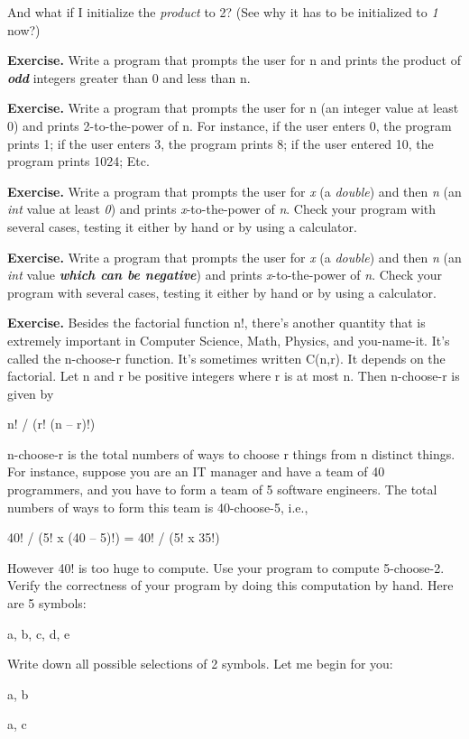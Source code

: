 \documentclass[
]{article}
\begin{document}
And what if I initialize the \emph{product} to 2? (See why it has to be
initialized to \emph{1} now?)

\textbf{Exercise.} Write a program that prompts the user for n and
prints the product of \emph{\textbf{odd}} integers greater than 0 and
less than n.

\textbf{Exercise.} Write a program that prompts the user for n (an
integer value at least 0) and prints 2-to-the-power of n. For instance,
if the user enters 0, the program prints 1; if the user enters 3, the
program prints 8; if the user entered 10, the program prints 1024; Etc.

\textbf{Exercise.} Write a program that prompts the user for \emph{x} (a
\emph{double}) and then \emph{n} (an \emph{int} value at least \emph{0})
and prints \emph{x}-to-the-power of \emph{n}. Check your program with
several cases, testing it either by hand or by using a calculator.

\textbf{Exercise.} Write a program that prompts the user for \emph{x} (a
\emph{double}) and then \emph{n} (an \emph{int} value
\emph{\textbf{which can be negative}}) and prints \emph{x}-to-the-power
of \emph{n}. Check your program with several cases, testing it either by
hand or by using a calculator.

\textbf{Exercise.} Besides the factorial function n!, there's another
quantity that is extremely important in Computer Science, Math, Physics,
and you-name-it. It's called the n-choose-r function. It's sometimes
written C(n,r). It depends on the factorial. Let n and r be positive
integers where r is at most n. Then n-choose-r is given by

n! / (r! (n -- r)!)

n-choose-r is the total numbers of ways to choose r things from n
distinct things. For instance, suppose you are an IT manager and have a
team of 40 programmers, and you have to form a team of 5 software
engineers. The total numbers of ways to form this team is 40-choose-5,
i.e.,

40! / (5! x (40 -- 5)!) = 40! / (5! x 35!)

However 40! is too huge to compute. Use your program to compute
5-choose-2. Verify the correctness of your program by doing this
computation by hand. Here are 5 symbols:

a, b, c, d, e

Write down all possible selections of 2 symbols. Let me begin for you:

a, b

a, c
\end{document}
